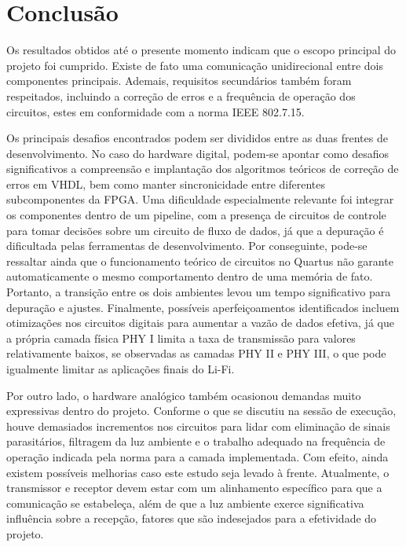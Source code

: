 	\chapter{Conclusão}\label{cap-conclusao}
	
	Os resultados obtidos até o presente momento indicam que o escopo principal do projeto foi cumprido. Existe de fato uma comunicação unidirecional entre dois componentes principais. Ademais, requisitos secundários também foram respeitados, incluindo a correção de erros e a frequência de operação dos circuitos, estes em conformidade com a norma IEEE 802.7.15. 
	
	Os principais desafios encontrados podem ser divididos entre as duas frentes de desenvolvimento. No caso do hardware digital, podem-se apontar como desafios significativos a compreensão e implantação dos algoritmos teóricos de correção de erros em VHDL, bem como manter sincronicidade entre diferentes subcomponentes da FPGA. Uma dificuldade especialmente relevante foi integrar os componentes dentro de um pipeline, com a presença de circuitos de controle para tomar decisões sobre um circuito de fluxo de dados, já que a depuração é dificultada pelas ferramentas de desenvolvimento. Por conseguinte, pode-se ressaltar ainda que o funcionamento teórico de circuitos no Quartus não garante automaticamente o mesmo comportamento dentro de uma memória de fato. Portanto, a transição entre os dois ambientes levou um tempo significativo para depuração e ajustes. Finalmente, possíveis aperfeiçoamentos identificados incluem otimizações nos circuitos digitais para aumentar a vazão de dados efetiva, já que a própria camada física PHY I limita a taxa de transmissão para valores relativamente baixos, se observadas as camadas PHY II e PHY III, o que pode igualmente limitar as aplicações finais do Li-Fi.
	
	Por outro lado, o hardware analógico também ocasionou demandas muito expressivas dentro do projeto. Conforme o que se discutiu na sessão de execução, houve demasiados incrementos nos circuitos para lidar com eliminação de sinais parasitários, filtragem da luz ambiente e o trabalho adequado na frequência de operação indicada pela norma para a camada implementada. Com efeito, ainda existem possíveis melhorias caso este estudo seja levado à frente. Atualmente, o transmissor e receptor devem estar com um alinhamento específico para que a comunicação se estabeleça, além de que a luz ambiente exerce significativa influência sobre a recepção, fatores que são indesejados para a efetividade do projeto.
	
